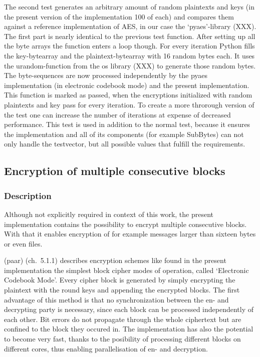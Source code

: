 The second test generates an arbitrary amount of random plaintexts and
keys (in the present version of the implementation 100 of each) and
compares them against a reference implementation of AES, in our case the
`pyaes'-library (XXX). The first part is nearly identical to the
previous test function. After setting up all the byte arrays the
function enters a loop though. For every iteration Python fills the
key-bytearray and the plaintext-bytearray with 16 random bytes each. It
uses the urandom-function from the os library (XXX) to generate those
random bytes. The byte-sequences are now processed independently by the
pyaes implementation (in electronic codebook mode) and the present
implementation. This function is marked as passed, when the encryptions
initialized with random plaintexts and key pass for every iteration. To
create a more throrough version of the test one can increase the number
of iterations at expense of decreased performance. This test is used in
addition to the normal test, because it ensures the implementation and
all of its components (for example SubBytes) can not only handle the
testvector, but all possible values that fulfill the requirements.

\hypertarget{encryption-of-multiple-consecutive-blocks}{%
\subsection{Encryption of multiple consecutive
blocks}\label{encryption-of-multiple-consecutive-blocks}}

\hypertarget{description-7}{%
\subsubsection{Description}\label{description-7}}

Although not explicitly required in context of this work, the present
implementation contains the possibility to encrypt multiple consecutive
blocks. With that it enables encryption of for example messages larger
than sixteen bytes or even files. 

(paar) (ch.~5.1.1) describes
encryption schemes like found in the present implementation the simplest
block cipher modes of operation, called `Electronic Codebook Mode'.
Every cipher block is generated by simply encrypting the plaintext with
the round keys and appending the encrypted blocks. The first advantage
of this method is that no synchronization between the en- and decrypting
party is necessary, since each block can be processed independently of
each other. Bit errors do not propagate through the whole ciphertext but
are confined to the block they occured in. The implementation has also
the potential to become very fast, thanks to the posibility of
processing different blocks on different cores, thus enabling
parallelisation of en- and decryption. 

